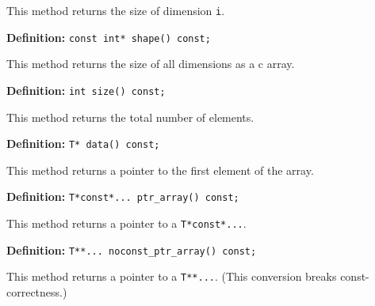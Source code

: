 \documentclass[11pt,twoside]{article}
\begin{document}
This method returns the size of dimension \texttt{i}.

\noindent\textbf{Definition:} \texttt{const int* shape() const;}

This method returns the size of all dimensions as a c array. 

\noindent\textbf{Definition:} \texttt{int size() const;}

This method returns the total number of elements.


\noindent\textbf{Definition:} \texttt{T* data() const;}

This method returns a pointer to the first element of the array.


\noindent\textbf{Definition:} \texttt{T*const*... ptr\_array() const;}

This method returns a pointer to a \texttt{T*const*...}. 


\noindent\textbf{Definition:} \texttt{T**... noconst\_ptr\_array() const;}

This method returns a pointer to a \texttt{T**...}. (This conversion breaks const-correctness.)

\end{document}
